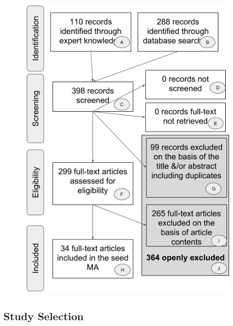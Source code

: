 \documentclass[man]{apa6}
\theoremstyle{definition}
\theoremstyle{definition}
\theoremstyle{definition}
\theoremstyle{remark}
\begin{document}
\begin{figure}
\centering
\includegraphics{figures/Figure_1_PRISMA_MA_Mispronunciation.png}
\caption{}
\end{figure}

\subsection{Study Selection}\label{study-selection}
\end{document}
